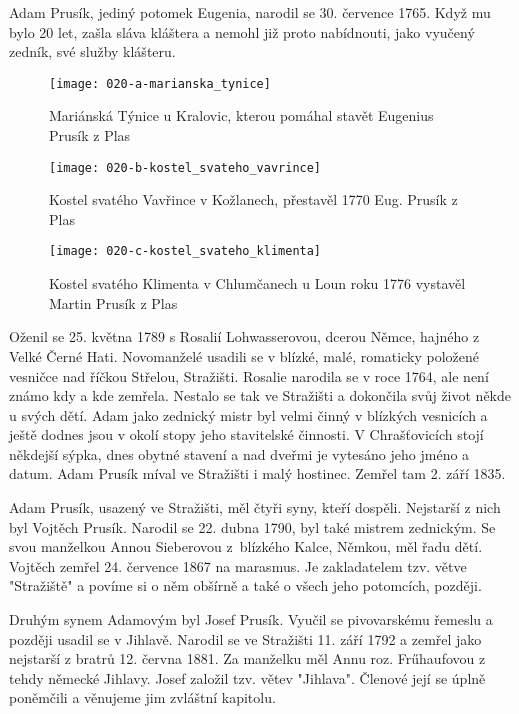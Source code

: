 \documentclass[../dejiny-rodu-prusiku.tex]{subfiles}
\begin{document}
Adam  Prusík, jediný potomek Eugenia, narodil se 30. července 1765. Když mu bylo 20 let, zašla sláva kláštera a nemohl již proto nabídnouti, jako vyučený zedník, své služby klášteru.


\begin{figure}
\centering
\texttt{[image: 020-a-marianska\_tynice]}
\caption{Mariánská Týnice u Kralovic, kterou pomáhal stavět Eugenius Prusík z Plas}
\label{fig:020-a-marianska_tynice}
\end{figure}
\begin{figure}
\centering
\texttt{[image: 020-b-kostel\_svateho\_vavrince]}
\caption{Kostel svatého Vavřince v Kožlanech, přestavěl 1770 Eug. Prusík z Plas}
\label{fig:020-b-kostel_svateho_vavrince}
\end{figure}
\begin{figure}
\centering
\texttt{[image: 020-c-kostel\_svateho\_klimenta]}
\caption{Kostel svatého Klimenta v Chlumčanech u Loun roku 1776 vystavěl Martin Prusík z Plas}
\label{fig:020-c-kostel_svateho_klimenta}
\end{figure}

Oženil se 25. května 1789 s Rosalií Lohwasserovou, dcerou Němce, hajného z Velké Černé Hati. Novomanželé usadili se v blízké, malé, romaticky položené vesničce nad říčkou Střelou, Stražišti. Rosalie narodila se v roce 1764, ale není známo kdy a kde zemřela. Nestalo se tak ve Stražišti a dokončila svůj život někde u svých dětí. Adam jako zednický mistr byl velmi činný v blízkých vesnicích a ještě dodnes jsou v okolí stopy jeho stavitelské činnosti. V Chrašťovicích stojí někdejší sýpka, dnes obytné stavení a nad dveřmi je vytesáno jeho jméno a datum. Adam Prusík míval ve Stražišti i malý hostinec. Zemřel tam 2. září 1835.

Adam Prusík, usazený ve Stražišti, měl čtyři syny, kteří dospěli. Nejstarší z nich byl Vojtěch Prusík. Narodil se 22. dubna 1790, byl také mistrem zednickým. Se svou manželkou Annou Sieberovou z~blízkého Kalce, Němkou, měl řadu dětí. Vojtěch zemřel 24. července 1867 na marasmus. Je zakladatelem tzv. větve "Stražiště" a povíme si o něm obšírně a také o všech jeho potomcích, později.

Druhým synem Adamovým byl Josef Prusík. Vyučil se pivovarskému řemeslu a později usadil se v Jihlavě. Narodil se ve Stražišti 11. září 1792 a zemřel jako nejstarší z bratrů 12. června 1881. Za manželku měl Annu roz. Frűhaufovou z tehdy německé Jihlavy. Josef založil tzv. větev "Jihlava". Členové její se úplně poněmčili a věnujeme jim zvláštní kapitolu.
\end{document}
